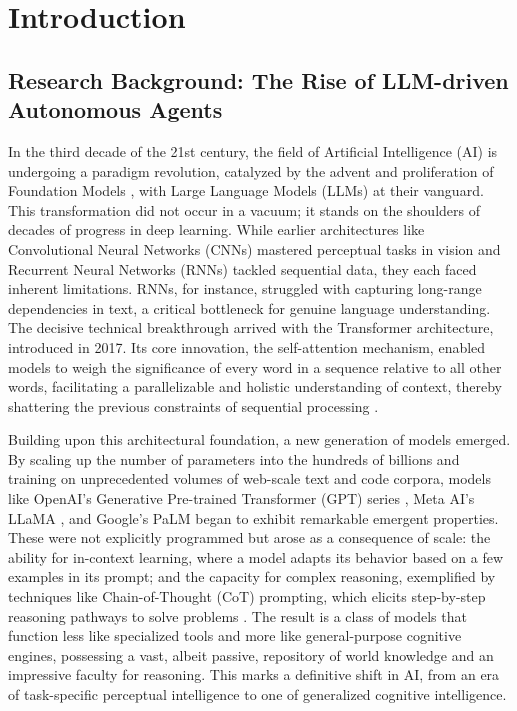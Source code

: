 
\chapter{Introduction} \label{chp:intro}

\section{Research Background: The Rise of LLM-driven Autonomous Agents}

In the third decade of the 21st century, the field of Artificial Intelligence (AI) is undergoing a paradigm revolution, catalyzed by the advent and proliferation of Foundation Models \cite{bommasani2021opportunities}, with Large Language Models (LLMs) at their vanguard. This transformation did not occur in a vacuum; it stands on the shoulders of decades of progress in deep learning. While earlier architectures like Convolutional Neural Networks (CNNs) mastered perceptual tasks in vision \cite{krizhevsky2012imagenet} and Recurrent Neural Networks (RNNs) tackled sequential data, they each faced inherent limitations. RNNs, for instance, struggled with capturing long-range dependencies in text, a critical bottleneck for genuine language understanding. The decisive technical breakthrough arrived with the Transformer architecture, introduced in 2017. Its core innovation, the self-attention mechanism, enabled models to weigh the significance of every word in a sequence relative to all other words, facilitating a parallelizable and holistic understanding of context, thereby shattering the previous constraints of sequential processing \cite{vaswani2017attention}.

Building upon this architectural foundation, a new generation of models emerged. By scaling up the number of parameters into the hundreds of billions and training on unprecedented volumes of web-scale text and code corpora, models like OpenAI's Generative Pre-trained Transformer (GPT) series \cite{brown2020language, openai2023gpt4}, Meta AI's LLaMA \cite{touvron2023llama}, and Google's PaLM \cite{chowdhery2022palm} began to exhibit remarkable emergent properties. These were not explicitly programmed but arose as a consequence of scale: the ability for in-context learning, where a model adapts its behavior based on a few examples in its prompt; and the capacity for complex reasoning, exemplified by techniques like Chain-of-Thought (CoT) prompting, which elicits step-by-step reasoning pathways to solve problems \cite{wei2022chain}. The result is a class of models that function less like specialized tools and more like general-purpose cognitive engines, possessing a vast, albeit passive, repository of world knowledge and an impressive faculty for reasoning. This marks a definitive shift in AI, from an era of task-specific perceptual intelligence to one of generalized cognitive intelligence.

